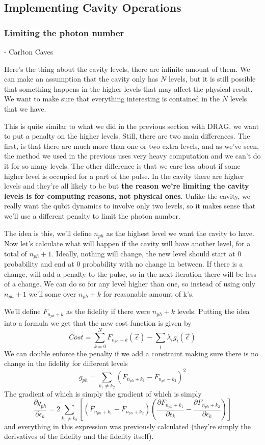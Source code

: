 \subsection{Implementing Cavity Operations}
\subsubsection{Limiting the photon number} 
\centerline{}
\centerline{- Carlton Caves}
Here's the thing about the cavity levels, there are infinite amount of them. We can make an assumption that the cavity only has $N$ levels, but it is still possible that something happens in the higher levels that may affect the physical result. We want to make sure that everything interesting is contained in the $N$ levels that we have.

This is quite similar to what we did in the previous section with DRAG, we want to put a penalty on the higher levels. Still, there are two main differences. The first, is that there are much more than one or two extra levels, and as we've seen, the method we used in the previous uses very heavy computation and we can't do it for so many levels. The other difference is that we care less about if some higher level is occupied for a part of the pulse. In the cavity there are higher levels and they're all likely to be but \textbf{the reason we're limiting the cavity levels is for computing reasons, not physical ones}. Unlike the cavity, we really want the qubit dynamics to involve only two levels, so it makes sense that we'll use a different penalty to limit the photon number.

The idea is this, we'll define $n_{ph}$ as the highest level we want the cavity to have. Now let's calculate what will happen if the cavity will have another level, for a total of $n_{ph} + 1$. Ideally, nothing will change, the new level should start at 0 probability and end at 0 probability with no change in between. If there is a change, will add a penalty to the pulse, so in the next iteration there will be less of a change. We can do so for any level higher than one, so instead of using only $n_{ph} + 1$ we'll some over $n_{ph} + k$ for reasonable amount of k's.

We'll define $F_{n_{ph} + k}$ as the fidelity if there were $n_{ph} + k$ levels. Putting the idea into a formula we get that the new cost function is given by
\[
    Cost = \sum_{k=0}^{N} F_{n_{ph} + k} (\vec{\epsilon}) - \sum_i \lambda_i g_i (\vec{\epsilon})
\]
We can double enforce the penalty if we add a constraint making sure there is no change in the fidelity for different levels
\[
    g_{ph} = \sum_{k_1 \ne k_2} (F_{n_{ph} + k_1} - F_{n_{ph} + k_2})^2
\]
The gradient of which is simply the gradient of which is simply
\[
    \frac{\partial g_{ph}}{\partial \epsilon_k} = 2 \sum_{k_1 \ne k_2} [ (F_{n_{ph} + k_1} - F_{n_{ph} + k_2}) (\frac{\partial F_{n_{ph} + k_1}}{\partial \epsilon_k} - \frac{\partial F_{n_{ph} + k_2}}{\partial \epsilon_k})]
\]
and everything in this expression was previously calculated (they're simply the derivatives of the fidelity and the fidelity itself).


